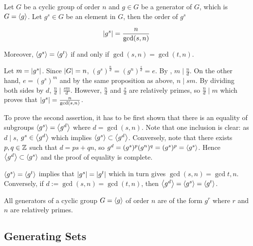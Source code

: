 \documentclass[a4paper,12pt]{article}
\begin{document}
\begin{pst}
  Let $G$ be a cyclic group of order $n$ and $g\in G$ be a generator of $G$, which is $G=\left\langle g\right\rangle$. Let $g^{s}\in G$ be an element in $G$, then the order of $g^{s}$

  $$\left| g^{s}\right|=\frac{n}{\gcd(s,n)}$$\s

  Moreover, $\left\langle g^{s}\right\rangle=\left\langle g^{t}\right\rangle$ if and only if $\gcd(s,n)=\gcd(t,n)$.\n

  \prf Let $m=\left| g^{s}\right|$. Since $\left| G\right|=n$, $(g^{s})^{\frac{n}{d}}=(g^{n})^{\frac{s}{d}}=e$. By \rpst[\sctd{26}], $m\mid\frac{n}{d}$. On the other hand, $e=(g^{s})^{m}$ and by the same proposition as above, $n\mid sm$. By dividing both sides by $d$, $\frac{n}{d}\mid\frac{sm}{d}$. However, $\frac{n}{d}$ and $\frac{s}{d}$ are relatively primes, so $\frac{n}{d}\mid{m}$ which proves that $\left| g^{s}\right|=\frac{n}{\gcd(s,n)}$.\n

  To prove the second assertion, it has to be first shown that there is an equality of subgroups $\left\langle g^{s}\right\rangle=\left\langle g^{d}\right\rangle$ where $d=\gcd(s,n)$. Note that one inclusion is clear: as $d\mid s$, $g^{s}\in \left\langle g^{d}\right\rangle$ which implies $\left\langle g^{s}\right\rangle\subset\left\langle g^{d}\right\rangle$. Conversely, note that there exists $p,q\in\mathbb{Z}$ such that $d=ps+qn$, so $g^{d}=(g^{s})^{p}(g^{n})^{q}=(g^{s})^{p}=\left\langle g^{s}\right\rangle$. Hence $\left\langle g^{d}\right\rangle\subset\left\langle g^{s}\right\rangle$ and the proof of equality is complete.\n

  $\left\langle g^{s}\right\rangle=\left\langle g^{t}\right\rangle$ implies that $\left| g^{s}\right|=\left| g^{t}\right|$ which in turn gives $\gcd(s,n)=\gcd{t,n}$. Conversely, if $d:=\gcd(s,n)=\gcd(t,n)$, then $\left\langle g^{d}\right\rangle=\left\langle g^{s}\right\rangle=\left\langle g^{t}\right\rangle$.
\end{pst}\n

\begin{crl}
  All generators of a cyclic group $G=\left\langle g\right\rangle$ of order $n$ are of the form $g^{r}$ where $r$ and $n$ are relatively primes.
\end{crl}

\subsection{Generating Sets}
\end{document}
